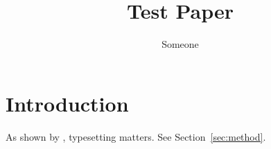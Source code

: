 \documentclass{article}
\title{Test Paper}
\author{Someone}
\begin{document}
\maketitle

\section{Introduction}
\label{sec:intro}
As shown by \cite{knuth1984}, typesetting matters. See Section~\ref{sec:method}.





\end{document}
